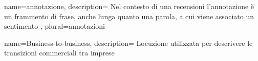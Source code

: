  {
name=annotazione,
description={
Nel contesto di una \gls{recensioni} l'annotazione è un frammento di frase, 
anche lunga quanto una parola, a cui viene associato un sentimento
},
plural=annotazioni
}

 {
name=Business-to-business,
description={
Locuzione utilizzata per descrivere le transizioni commerciali tra imprese
}
}




